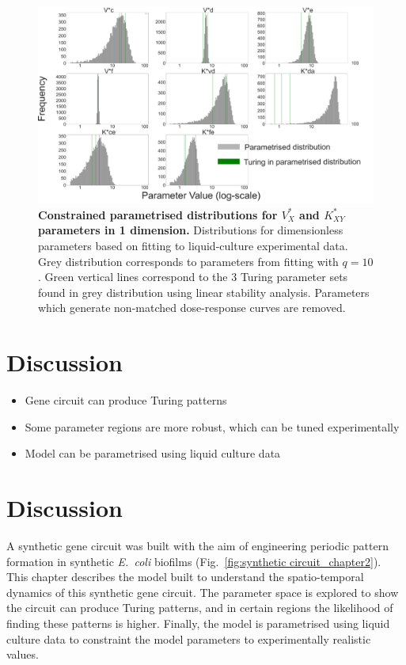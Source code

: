 \begin{figure}[H] %
    \centering
    \begin{adjustbox}{center}
        \includegraphics[width=1\textwidth]{chapters/Chapter 2/1d_distributions} %
    \end{adjustbox}
    \caption{\textbf{Constrained parametrised distributions for $V^*_X$ and $K^*_{XY}$ parameters in 1 dimension.}
    Distributions for dimensionless parameters based on fitting to liquid-culture experimental data.
    Grey distribution corresponds to parameters from fitting with $q=10$.
    Green vertical lines correspond to the 3 Turing parameter sets
    found in grey distribution using linear stability analysis. Parameters which generate non-matched dose-response curves are removed.}
    \label{fig:1d_distributions} %
\end{figure}

\section{Discussion}
\begin{itemize}
    \item Gene circuit can produce Turing patterns
    \item Some parameter regions are more robust, which can be tuned experimentally
    \item Model can be parametrised using liquid culture data
\end{itemize}


\section{Discussion}
A synthetic gene circuit was built with the aim of engineering periodic pattern formation in synthetic \textit{E.~coli} biofilms (Fig.~\ref{fig:synthetic circuit_chapter2}).
This chapter describes the model built to understand the spatio-temporal dynamics of this synthetic gene circuit.
The parameter space is explored to show the circuit can produce Turing patterns, and in certain regions the likelihood of finding these patterns is higher.
Finally, the model is parametrised using liquid culture data to constraint the model parameters to experimentally realistic values.

